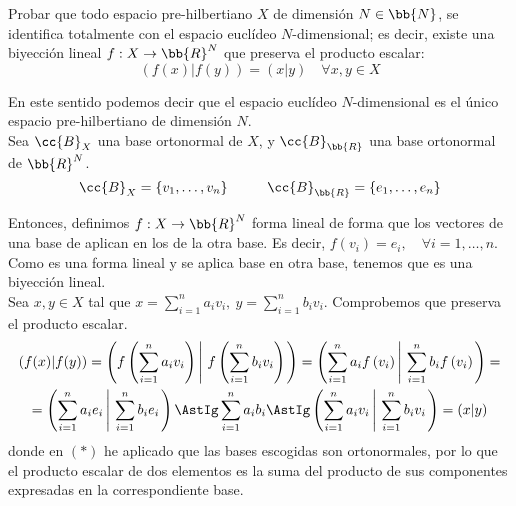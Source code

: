 \begin{ejercicio}
    Probar que todo espacio pre-hilbertiano $X$ de dimensión $N \in \bb{N}$, se identifica totalmente con el espacio euclídeo $N$-dimensional; es decir, existe una biyección lineal $f : X \to \bb{R}^{N}$ que preserva el producto escalar:
    \begin{equation*}
        \left(f(x)|f(y)\right)=(x|y) \quad \forall x,y \in X
    \end{equation*}

    En este sentido podemos decir que el espacio euclídeo $N$-dimensional es el único espacio pre-hilbertiano de dimensión $N$.\\

    Sea $\cc{B}_X$ una base ortonormal de $X$, y $\cc{B}_{\bb{R}}$ una base ortonormal de $\bb{R}^N$.
    \begin{equation*}
        \cc{B}_X=\{v_1,\dots, v_n\}
        \hspace{1cm}
        \cc{B}_{\bb{R}}=\{e_1,\dots, e_n\}
    \end{equation*}

    Entonces, definimos $f:X\to \bb{R}^N$ forma lineal de forma que los vectores de una base de aplican en los de la otra base. Es decir, $f(v_i)=e_i, \quad \forall i=1,\dots, n$. Como es una forma lineal y se aplica base en otra base, tenemos que es una biyección lineal.\\
    
    Sea $x, y\in X$ tal que $x=\sum\limits_{i=1}^n a_iv_i,~ y=\sum\limits_{i=1}^n b_iv_i$. Comprobemos que preserva el producto escalar. 
    \begin{multline*}
        \left(f(x)|f(y)\right)
        = \left(f\left(\sum_{i=1}^n a_iv_i\right)\left|~f\left(\sum_{i=1}^n b_iv_i\right)\right.\right)
        = \left(\sum_{i=1}^n a_if\left(v_i\right)\left|~\sum_{i=1}^n b_if\left(v_i\right)\right.\right) =\\
        = \left(\sum_{i=1}^n a_ie_i\left|~\sum_{i=1}^n b_ie_i\right.\right)
        \AstIg \sum_{i=1}^n a_ib_i
        \AstIg \left(\sum_{i=1}^n a_iv_i\left|~\sum_{i=1}^n b_iv_i\right.\right)
        = (x|y)
    \end{multline*}
    donde en $(\ast)$ he aplicado que las bases escogidas son ortonormales, por lo que el producto escalar de dos elementos es la suma del producto de sus componentes expresadas en la correspondiente base.
\end{ejercicio}


